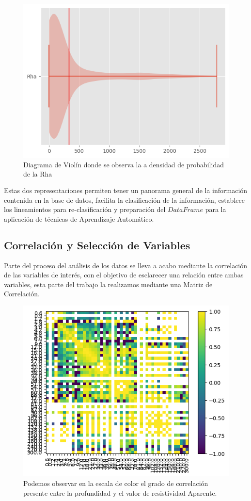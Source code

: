\documentclass[sn-mathphys,Numbered]{sn-jnl}%
\theoremstyle{thmstyleone}%
\theoremstyle{thmstyletwo}%
\theoremstyle{thmstylethree}%
\begin{document}
\begin{figure}[H]
	\centering
	\includegraphics[width=0.7\linewidth]{imagenes/diagrama de violin distribucion de resissitivdades aparentes}
	\caption[Figura]{Diagrama de Violín donde se observa la a densidad de probabilidad de la Rha}
	\label{fig:diagrama de violin}
\end{figure}

Estas dos representaciones permiten tener un panorama general de la información contenida en la base de datos, facilita la clasificación de la información, establece los lineamientos para re-clasificación y preparación del $DataFrame$ para la aplicación de técnicas de Aprendizaje Automático.

\subsection{Correlación y Selección de Variables}\label{subsec5}

Parte del proceso del análisis de los datos se lleva a acabo mediante la correlación  de las variables de interés, con el objetivo de esclarecer una relación entre ambas variables, esta parte del trabajo la realizamos mediante una Matriz de Correlación. 

\begin{figure}[H]
	\centering
	\includegraphics[width=0.7\linewidth]{imagenes/matriz de correlacion}
	\caption[Figura]{Podemos observar en la escala de color el grado de correlación presente entre la profundidad y el valor de resistividad Aparente.}
	\label{fig:Matrix de correlacion}
\end{figure}
\end{document}
